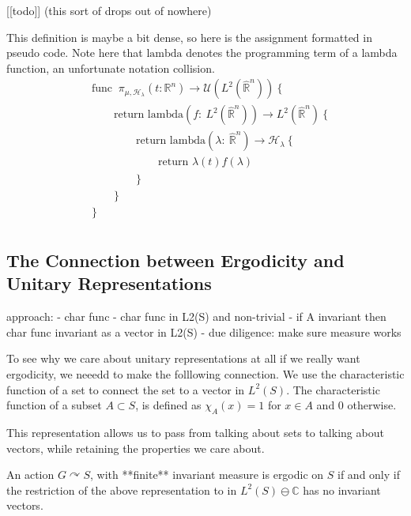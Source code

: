 \documentclass[
]{article}
\begin{document}
{[}{[}todo{]}{]} (this sort of drops out of nowhere)

This definition is maybe a bit dense, so here is the assignment
formatted in pseudo code. Note here that \(\text{lambda}\) denotes the
programming term of a lambda function, an unfortunate notation
collision. \[
\begin{align*}
& \text{func }\ \pi_{\mu,\mathscr{H}_{\lambda}}(t: \mathbb{R}^n) \rightarrow \mathcal{U}(L^2(\hat{\mathbb{R}}^n)) \ \{ \\
& \qquad \text{return lambda}(f:\ L^2(\hat{\mathbb{R}}^n)) \rightarrow L^2(\hat{\mathbb{R}}^n) \ \{ \\
& \qquad \qquad \text{return lambda}(\lambda:\ \hat{\mathbb{R}}^n) \rightarrow \mathscr{H}_{\lambda} \ \{ \\
& \qquad \qquad \qquad \text{return }\lambda(t)f(\lambda) \\
& \qquad \qquad \} \\
& \qquad \} \\
& \} \\
\end{align*}
\]

\hypertarget{the-connection-between-ergodicity-and-unitary-representations}{%
\subsection{The Connection between Ergodicity and Unitary
Representations}\label{the-connection-between-ergodicity-and-unitary-representations}}

approach: - char func - char func in L2(S) and non-trivial - if A
invariant then char func invariant as a vector in L2(S) - due diligence:
make sure measure works

To see why we care about unitary representations at all if we really
want ergodicity, we neeedd to make the folllowing connection. We use the
characteristic function of a set to connect the set to a vector in
\(L^2(S)\). The characteristic function of a subset \(A\subset S\), is
defined as \(\chi_A(x) = 1\) for \(x \in A\) and \(0\) otherwise.

This representation allows us to pass from talking about sets to talking
about vectors, while retaining the properties we care about.

\begin{thm}
An action $G\curvearrowright S$, with **finite** invariant measure is ergodic on $S$ if and only if the restriction of the above representation to  in $L^2(S) \ominus \mathbb{C}$ has no invariant vectors.
\end{thm}
\end{document}
